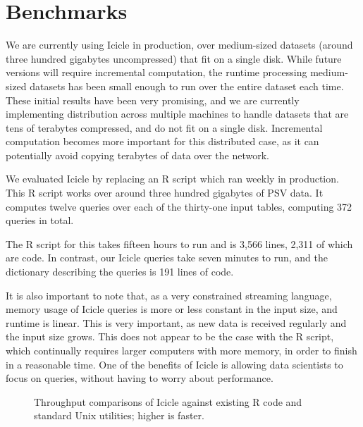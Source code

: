 \section{Benchmarks}
\label{s:Benchmarks}

We are currently using Icicle in production, over medium-sized datasets (around three hundred gigabytes uncompressed) that fit on a single disk.
While future versions will require incremental computation, the runtime processing medium-sized datasets has been small enough to run over the entire dataset each time.
These initial results have been very promising, and we are currently implementing distribution across multiple machines to handle datasets that are tens of terabytes compressed, and do not fit on a single disk.
Incremental computation becomes more important for this distributed case, as it can potentially avoid copying terabytes of data over the network.

We evaluated Icicle by replacing an R script which ran weekly in production.
This R script works over around three hundred gigabytes of PSV data.
It computes twelve queries over each of the thirty-one input tables, computing 372 queries in total.

The R script for this takes fifteen hours to run and is 3,566 lines, 2,311 of which are code.
In contrast, our Icicle queries take seven minutes to run, and the dictionary describing the queries is 191 lines of code.

It is also important to note that, as a very constrained streaming language, memory usage of Icicle queries is more or less constant in the input size, and runtime is linear.
This is very important, as new data is received regularly and the input size grows.
This does not appear to be the case with the R script, which continually requires larger computers with more memory, in order to finish in a reasonable time.
One of the benefits of Icicle is allowing data scientists to focus on queries, without having to worry about performance.

\begin{figure}


\caption{Throughput comparisons of Icicle against existing R code and standard Unix utilities; higher is faster.}
\label{fig:bench:other}
\end{figure}


